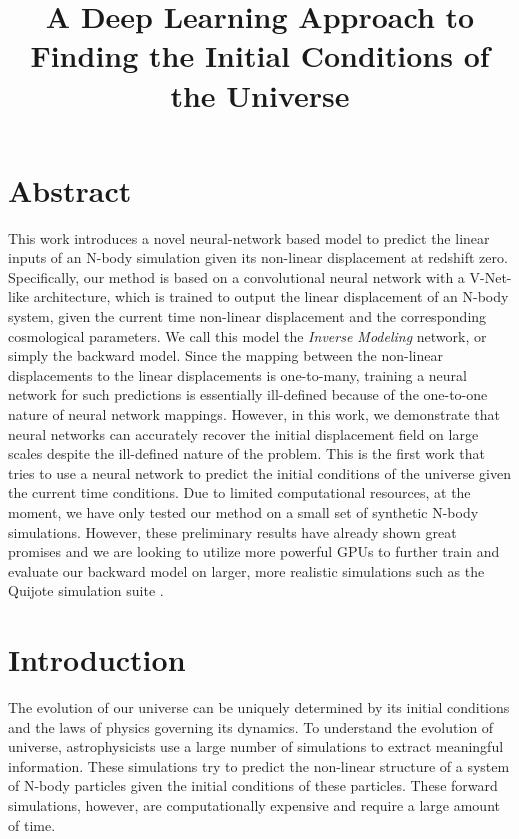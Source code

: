 \documentclass[11pt]{article}
\title{A Deep Learning Approach to Finding the Initial Conditions of the Universe}
\makeatletter
\let\inserttitle\@title
\makeatother
\begin{document}
\begin{center}
  \LARGE{\inserttitle}

\end{center}

\section{Abstract}

This work introduces a novel neural-network based model to predict the linear inputs of an N-body simulation given its non-linear displacement at redshift zero.
Specifically, our method is based on a convolutional neural network with a V-Net-like architecture, which is trained to output the linear displacement of an N-body system, given the current time non-linear displacement and the corresponding cosmological parameters.
We call this model the \textit{Inverse Modeling} network, or simply the backward model.
Since the mapping between the non-linear displacements to the linear displacements is one-to-many, training a neural network for such predictions is essentially ill-defined because of the one-to-one nature of neural network mappings.
However, in this work, we demonstrate that neural networks can accurately recover the initial displacement field on large scales despite the ill-defined nature of the problem.
This is the first work that tries to use a neural network to predict the initial conditions of the universe given the current time conditions.
Due to limited computational resources, at the moment, we have only tested our method on a small set of synthetic N-body simulations. However, these preliminary results have already shown great promises and we are looking to utilize more powerful GPUs to further train and evaluate our backward model on larger, more realistic simulations such as the Quijote simulation suite \cite{quijote}.

\section{Introduction}

The evolution of our universe can be uniquely determined by its initial conditions and the laws of physics governing its dynamics. To understand the evolution of  universe, astrophysicists use a large number of simulations to extract meaningful information. These simulations try to predict the non-linear structure of a system of N-body particles given the initial conditions of these particles. These forward simulations, however, are computationally expensive and require a large amount of time.
\end{document}
